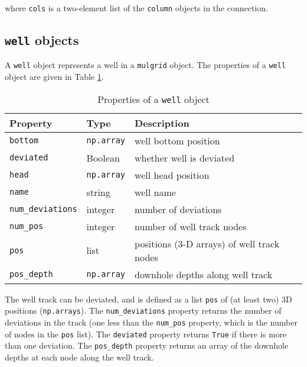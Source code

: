 where \texttt{cols} is a two-element list of the \texttt{column} objects in the connection.

\subsection{\texttt{well} objects}
\label{wellobjects}

A \texttt{well} object represents a well in a \texttt{mulgrid} object.  The properties of a \texttt{well} object are given in Table \ref{tb:well_properties}.

\begin{table}
  \begin{center}
    \begin{tabular}{|l|l|l|}
      \hline
      \textbf{Property} & \textbf{Type} & \textbf{Description}\\
      \hline
      \texttt{bottom} & \texttt{np.array} & well bottom position \\
      \texttt{deviated} & Boolean &  whether well is deviated\\
      \texttt{head} & \texttt{np.array} & well head position \\
      \texttt{name} & string & well name \\
      \texttt{num\_deviations} & integer & number of deviations \\
      \texttt{num\_pos} & integer & number of well track nodes \\
      \texttt{pos} & list & positions (3-D arrays) of well track nodes \\
      \texttt{pos\_depth} & \texttt{np.array} & downhole depths along well track \\
      \hline
    \end{tabular}
    \caption{Properties of a \texttt{well} object}
    \label{tb:well_properties}
  \end{center}
\end{table}

The well track can be deviated, and is defined as a list \texttt{pos} of (at least two) 3D positions (\texttt{np.arrays}).  The \texttt{num\_deviations} property returns the number of deviations in the track (one less than the \texttt{num\_pos} property, which is the number of nodes in the \texttt{pos} list).  The \texttt{deviated} property returns \texttt{True} if there is more than one deviation.  The \texttt{pos\_depth} property returns an array of the downhole depths at each node along the well track.

